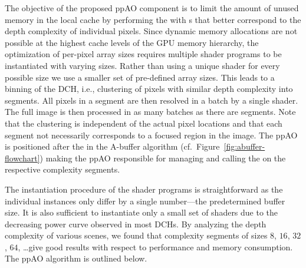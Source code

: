 \documentclass{egpubl}
\makeatletter
\newcommand{\removelatexerror}{\let\@latex@error\@gobble}
\newcommand{\ab}{\mbox{A-buffer}}
\newcommand{\dch}{DCH}
\newcommand{\stencil}{ppAO}
\makeatother
\begin{document}
The objective of the proposed \stencil{} component is to limit the amount of unused memory in the local cache by performing the \sResolve{} with \bArray{}s that better correspond to the depth complexity of individual pixels. 
Since dynamic memory allocations are not possible at the highest cache levels of the GPU memory hierarchy, the optimization of per-pixel array sizes requires multiple shader programs to be instantiated with varying \bArray{} sizes.
Rather than using a unique shader for every possible \bArray{} size we use a smaller set of pre-defined array sizes. 
This leads to a binning of the \dch{}, i.e.{}, clustering of pixels with similar depth complexity into segments. 
All pixels in a segment are then resolved in a batch by a single shader. 
The full image is then processed in as many batches as there are segments. 
Note that the clustering is independent of the actual pixel locations and that each segment not necessarily corresponds to a focused region in the image. 
The \stencil{} is positioned after the \sFill{} in the \ab{} algorithm (cf.~Figure~\ref{fig:abuffer-flowchart}) making the \stencil{} responsible for managing and calling the \sResolve{} on the respective complexity segments.

The instantiation procedure of the shader programs is straightforward as the individual instances only differ by a single number---the predetermined buffer size. 
It is also sufficient to instantiate only a small set of shaders due to the decreasing power curve observed in most \dch{}s. 
By analyzing the depth complexity of various scenes, we found that complexity segments of sizes $8$, $16$, $32$, $64$, \ldots give good results with respect to performance and memory consumption.
The \stencil{} algorithm is outlined below.

\begingroup
\removelatexerror%
\begin{algorithm}[H]
  \tcp{\sFill}
\end{algorithm}
\endgroup
\end{document}

